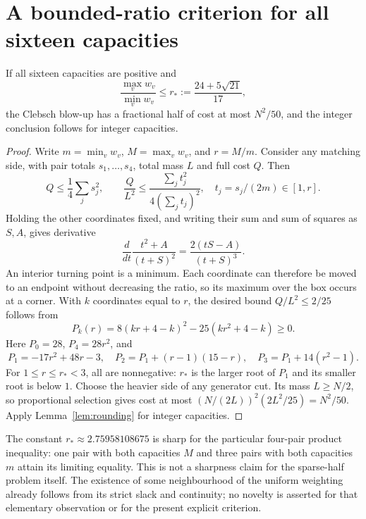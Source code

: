 \section{A bounded-ratio criterion for all sixteen capacities}

\begin{proposition}\label{prop:ratio}
If all sixteen capacities are positive and
\[
 \frac{\max_vw_v}{\min_vw_v}\leq r_*:=\frac{24+5\sqrt{21}}{17},
\]
the Clebsch blow-up has a fractional half of cost at most $N^2/50$,
and the integer conclusion follows for integer capacities.
\end{proposition}
\begin{proof}
Write $m=\min_vw_v$, $M=\max_vw_v$, and $r=M/m$.
Consider any matching side, with pair totals $s_1,\ldots,s_4$,
total mass $L$ and full cost $Q$. Then
\[
 Q\leq\frac14\sum_js_j^2,\qquad
 \frac{Q}{L^2}\leq\frac{\sum_jt_j^2}{4(\sum_jt_j)^2},
 \quad t_j=s_j/(2m)\in[1,r].
\]
Holding the other coordinates fixed, and writing their sum and sum of
squares as $S,A$, gives derivative
\[
 \frac{d}{dt}\frac{t^2+A}{(t+S)^2}
 =\frac{2(tS-A)}{(t+S)^3}.
\]
An interior turning point is a minimum. Each coordinate can therefore
be moved to an endpoint without decreasing the ratio, so its maximum
over the box occurs at a corner. With $k$ coordinates equal to $r$,
the desired bound $Q/L^2\leq2/25$ follows from
\[
 P_k(r)=8(kr+4-k)^2-25(kr^2+4-k)\geq0.
\]
Here $P_0=28$, $P_4=28r^2$, and
\[
 P_1=-17r^2+48r-3,\quad
 P_2=P_1+(r-1)(15-r),\quad
 P_3=P_1+14(r^2-1).
\]
For $1\leq r\leq r_*<3$, all are nonnegative: $r_*$ is the larger
root of $P_1$ and its smaller root is below $1$.
Choose the heavier side of any generator cut. Its mass $L\geq N/2$,
so proportional selection gives cost at most
$(N/(2L))^2(2L^2/25)=N^2/50$.
Apply Lemma~\ref{lem:rounding} for integer capacities.
\end{proof}

The constant $r_*\approx2.75958108675$ is sharp for the particular
four-pair product inequality: one pair with both capacities $M$ and
three pairs with both capacities $m$ attain its limiting equality.
This is not a sharpness claim for the sparse-half problem itself.
The existence of some neighbourhood of the uniform weighting already
follows from its strict slack and continuity; no novelty is asserted
for that elementary observation or for the present explicit criterion.
